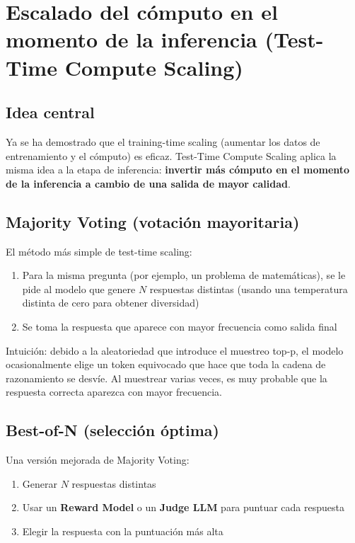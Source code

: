\documentclass[a4paper]{article}
\begin{document}
\newpage
\section{Escalado del cómputo en el momento de la inferencia (Test-Time Compute Scaling)}

\subsection{Idea central}

Ya se ha demostrado que el training-time scaling (aumentar los datos de entrenamiento y el cómputo) es eficaz. Test-Time Compute Scaling aplica la misma idea a la etapa de inferencia: \textbf{invertir más cómputo en el momento de la inferencia a cambio de una salida de mayor calidad}.

\subsection{Majority Voting (votación mayoritaria)}

El método más simple de test-time scaling:

\begin{enumerate}
    \item Para la misma pregunta (por ejemplo, un problema de matemáticas), se le pide al modelo que genere $N$ respuestas distintas (usando una temperatura distinta de cero para obtener diversidad)
    \item Se toma la respuesta que aparece con mayor frecuencia como salida final
\end{enumerate}

Intuición: debido a la aleatoriedad que introduce el muestreo top-p, el modelo ocasionalmente elige un token equivocado que hace que toda la cadena de razonamiento se desvíe. Al muestrear varias veces, es muy probable que la respuesta correcta aparezca con mayor frecuencia.

\subsection{Best-of-N (selección óptima)}

Una versión mejorada de Majority Voting:

\begin{enumerate}
    \item Generar $N$ respuestas distintas
    \item Usar un \textbf{Reward Model} o un \textbf{Judge LLM} para puntuar cada respuesta
    \item Elegir la respuesta con la puntuación más alta
\end{enumerate}
\end{document}
